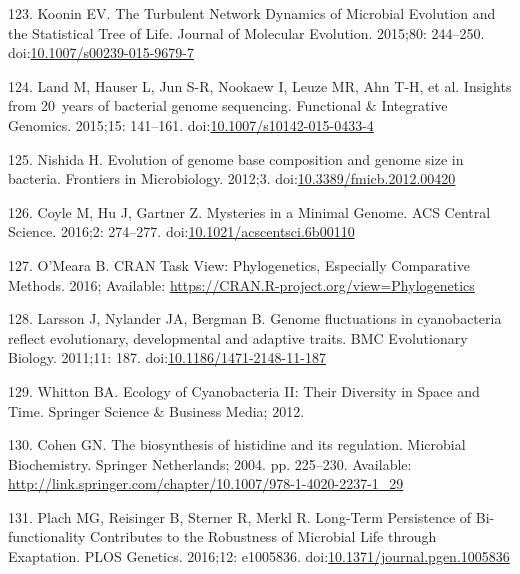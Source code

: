\documentclass[12pt,twoside]{reedthesis}
\begin{document}
  \hypertarget{ref-kooninux5fturbulentux5f2015}{}
  123. Koonin EV. The Turbulent Network Dynamics of Microbial Evolution
  and the Statistical Tree of Life. Journal of Molecular Evolution.
  2015;80: 244--250.
  doi:\href{https://doi.org/10.1007/s00239-015-9679-7}{10.1007/s00239-015-9679-7}
  
  \hypertarget{ref-landux5finsightsux5f2015}{}
  124. Land M, Hauser L, Jun S-R, Nookaew I, Leuze MR, Ahn T-H, et al.
  Insights from 20~years of bacterial genome sequencing. Functional \&
  Integrative Genomics. 2015;15: 141--161.
  doi:\href{https://doi.org/10.1007/s10142-015-0433-4}{10.1007/s10142-015-0433-4}
  
  \hypertarget{ref-nishidaux5fevolutionux5f2012}{}
  125. Nishida H. Evolution of genome base composition and genome size in
  bacteria. Frontiers in Microbiology. 2012;3.
  doi:\href{https://doi.org/10.3389/fmicb.2012.00420}{10.3389/fmicb.2012.00420}
  
  \hypertarget{ref-coyleux5fmysteriesux5f2016}{}
  126. Coyle M, Hu J, Gartner Z. Mysteries in a Minimal Genome. ACS
  Central Science. 2016;2: 274--277.
  doi:\href{https://doi.org/10.1021/acscentsci.6b00110}{10.1021/acscentsci.6b00110}
  
  \hypertarget{ref-omearaux5fcranux5f2016}{}
  127. O'Meara B. CRAN Task View: Phylogenetics, Especially Comparative
  Methods. 2016; Available:
  \url{https://CRAN.R-project.org/view=Phylogenetics}
  
  \hypertarget{ref-larssonux5fgenomeux5f2011}{}
  128. Larsson J, Nylander JA, Bergman B. Genome fluctuations in
  cyanobacteria reflect evolutionary, developmental and adaptive traits.
  BMC Evolutionary Biology. 2011;11: 187.
  doi:\href{https://doi.org/10.1186/1471-2148-11-187}{10.1186/1471-2148-11-187}
  
  \hypertarget{ref-whittonux5fecologyux5f2012}{}
  129. Whitton BA. Ecology of Cyanobacteria II: Their Diversity in Space
  and Time. Springer Science \& Business Media; 2012.
  
  \hypertarget{ref-cohenux5fbiosynthesisux5f2004}{}
  130. Cohen GN. The biosynthesis of histidine and its regulation.
  Microbial Biochemistry. Springer Netherlands; 2004. pp. 225--230.
  Available:
  \url{http://link.springer.com/chapter/10.1007/978-1-4020-2237-1_29}
  
  \hypertarget{ref-plachux5flong-termux5f2016}{}
  131. Plach MG, Reisinger B, Sterner R, Merkl R. Long-Term Persistence of
  Bi-functionality Contributes to the Robustness of Microbial Life through
  Exaptation. PLOS Genetics. 2016;12: e1005836.
  doi:\href{https://doi.org/10.1371/journal.pgen.1005836}{10.1371/journal.pgen.1005836}
  
\end{document}
